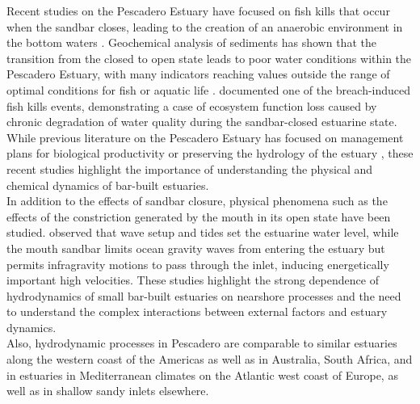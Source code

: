 \documentclass[tesis.tex]{subfiles}
\begin{document}
Recent studies on the Pescadero Estuary have focused on fish kills that occur when the sandbar closes, leading to the creation of an anaerobic environment in the bottom waters \citep{sloan2006ecological}. Geochemical analysis of sediments has shown that the transition from the closed to open state leads to poor water conditions within the Pescadero Estuary, with many indicators reaching values outside the range of optimal conditions for fish or aquatic life \citep{richards2018}. \cite{huber2020environmental} documented one of the breach-induced fish kills events, demonstrating a case of ecosystem function loss caused by chronic degradation of water quality during the sandbar-closed estuarine state. While previous literature on the Pescadero Estuary has focused on management plans for biological productivity \citep{curry1985pescadero} or preserving the hydrology of the estuary \citep{williams1990pescadero}, these recent studies highlight the importance of understanding the physical and chemical dynamics of bar-built estuaries.\\

In addition to the effects of sandbar closure, physical phenomena such as the effects of the constriction generated by the mouth in its open state have been studied. \cite{williams2016} observed that wave setup and tides set the estuarine water level, while the mouth sandbar limits ocean gravity waves from entering the estuary but permits infragravity motions to pass through the inlet, inducing energetically important high velocities. These studies highlight the strong dependence of hydrodynamics of small bar-built estuaries on nearshore processes and the need to understand the complex interactions between external factors and estuary dynamics.\\



Also, hydrodynamic processes in Pescadero are comparable to similar estuaries along the western coast of the Americas as well as in Australia, South Africa, and in estuaries in Mediterranean climates on the Atlantic west coast of Europe, as well as in shallow sandy inlets elsewhere.\\
\end{document}
